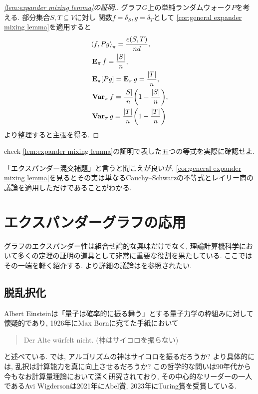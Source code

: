 %
\begin{proof}[\cref{lem:expander mixing lemma}の証明.]
    グラフ$G$上の単純ランダムウォーク$P$を考える.
    部分集合$S,T\subseteq V$に対し
    関数$f=\delta_S,g=\delta_T$として
    \cref{cor:general expander mixing lemma}を適用すると
    \begin{align*}
         & \piprod{f,Pg} = \frac{e(S,T)}{nd},               \\
         & \Epi f = \frac{|S|}{n},                          \\
         & \Epi [Pg] = \Epi g = \frac{|T|}{n},              \\
         & \Varpi f = \frac{|S|}{n}\rbra*{1-\frac{|S|}{n}}, \\
         & \Varpi g = \frac{|T|}{n}\rbra*{1-\frac{|T|}{n}}
    \end{align*}
    より整理すると主張を得る.
\end{proof}
\begin{exercise}{}{check}
    \cref{lem:expander mixing lemma}の証明で表した五つの等式を実際に確認せよ.
\end{exercise}
「エクスパンダー混交補題」と言うと聞こえが良いが, \cref{cor:general expander mixing lemma}を見るとその実は単なるCauchy--Schwarzの不等式とレイリー商の議論を適用しただけであることがわかる.

\section{エクスパンダーグラフの応用} \label{sec:expander graph application}
グラフのエクスパンダー性は組合せ論的な興味だけでなく,
理論計算機科学において多くの定理の証明の道具として非常に重要な役割を果たしている.
ここではその一端を軽く紹介する.
より詳細の議論は\cite{HLW06}を参照されたい.
%
\subsection{脱乱択化}
Albert Einsteinは「量子は確率的に振る舞う」とする量子力学の枠組みに対して懐疑的であり,
1926年にMax Bornに宛てた手紙において
\begin{quotation}
    Der Alte würfelt nicht. (神はサイコロを振らない)
\end{quotation}
と述べている.
では, アルゴリズムの神はサイコロを振るだろうか?
より具体的には, 乱択は計算能力を真に向上させるだろうか?
この哲学的な問いは90年代から今もなお計算量理論において深く研究されており,
その中心的なリーダーの一人であるAvi Wigdersonは2021年にAbel賞, 2023年にTuring賞を受賞している.

